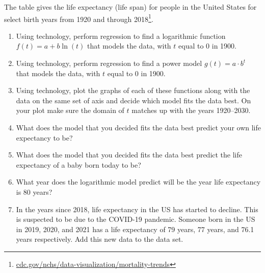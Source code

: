 \newpage

%

The table gives the life expectancy (life span)
for people in the United States for select birth years
from 1920 and through 2018\footnote{\href{https://www.cdc.gov/nchs/data-visualization/mortality-trends/}{cdc.gov/nchs/data-visualization/mortality-trends}}.

\begin{minipage}[t]{0.8\textwidth}
    \begin{enumerate}
        \item
    Using technology, perform regression to
            find a logarithmic function \(f(t) = a + b\ln(t)\) 
    that models the data,
    with \(t\) equal to \(0\) in 1900.

        \item
    Using technology, perform regression to
    find a power model \(g(t) = a\cdot b^t\) 
    that models the data,
    with \(t\) equal to \(0\) in 1900.

        \item
            Using technology,
    plot the graphs of each of these functions
    along with the data on the same set of axis
    and decide which model fits the data best. 
    On your plot make sure the domain of \(t\)
    matches up with the years 1920--2030.

\item 
    What does the model that you decided 
            fits the data best predict your own life expectancy to be?

\item 
    What does the model that you decided 
            fits the data best predict 
            the life expectancy of a baby born today to be?

\item 
    What year does the logarithmic model
    predict will be the year life expectancy is 80 years?

\item 
    In the years since 2018, 
    life expectancy in the US has started to decline\footnotemark.
            This is suspected to be due to the \textsc{COVID}-19 pandemic.
            Someone born in the US in 2019, 2020, and 2021 
            has a life expectancy of 79 years, 77 years, and 76.1 years respectively.
            Add this new data to the data set.


\end{enumerate}
\end{minipage}
